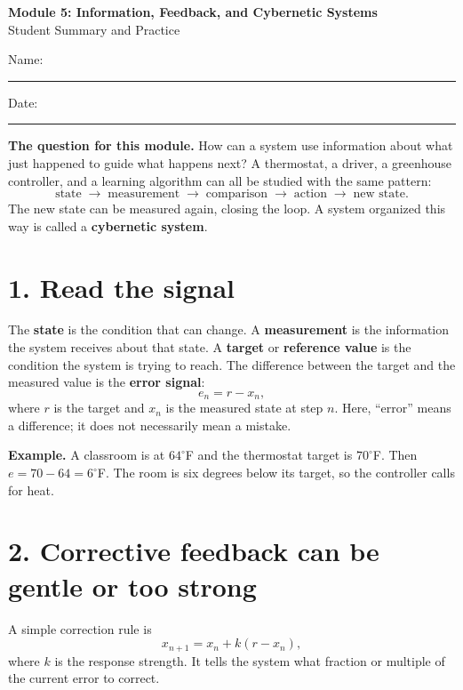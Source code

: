\documentclass[12pt]{article}
\begin{document}
\begin{center}
{\Large\bfseries\color{navy}Module 5: Information, Feedback, and Cybernetic Systems}\\[4pt]
{\large Student Summary and Practice}
\end{center}
\vspace{2mm}
\noindent Name: \rule{3.1in}{0.4pt}\hfill Date: \rule{1.4in}{0.4pt}

\begin{mdframed}[backgroundcolor=pale,linecolor=navy]
\textbf{The question for this module.} How can a system use information about what just happened to guide what happens next? A thermostat, a driver, a greenhouse controller, and a learning algorithm can all be studied with the same pattern:
\[
\boxed{\text{state}\;\longrightarrow\;\text{measurement}\;\longrightarrow\;\text{comparison}\;\longrightarrow\;\text{action}\;\longrightarrow\;\text{new state}}.
\]
The new state can be measured again, closing the loop. A system organized this way is called a \textbf{cybernetic system}.
\end{mdframed}

\section*{1. Read the signal}
The \textbf{state} is the condition that can change. A \textbf{measurement} is the information the system receives about that state. A \textbf{target} or \textbf{reference value} is the condition the system is trying to reach. The difference between the target and the measured value is the \textbf{error signal}:
\[
e_n=r-x_n,
\]
where $r$ is the target and $x_n$ is the measured state at step $n$. Here, ``error'' means a difference; it does not necessarily mean a mistake.

\textbf{Example.} A classroom is at $64^\circ$F and the thermostat target is $70^\circ$F. Then $e=70-64=6^\circ$F. The room is six degrees below its target, so the controller calls for heat.

\section*{2. Corrective feedback can be gentle or too strong}
A simple correction rule is
\[
x_{n+1}=x_n+k(r-x_n),
\]
where $k$ is the response strength. It tells the system what fraction or multiple of the current error to correct.
\end{document}
